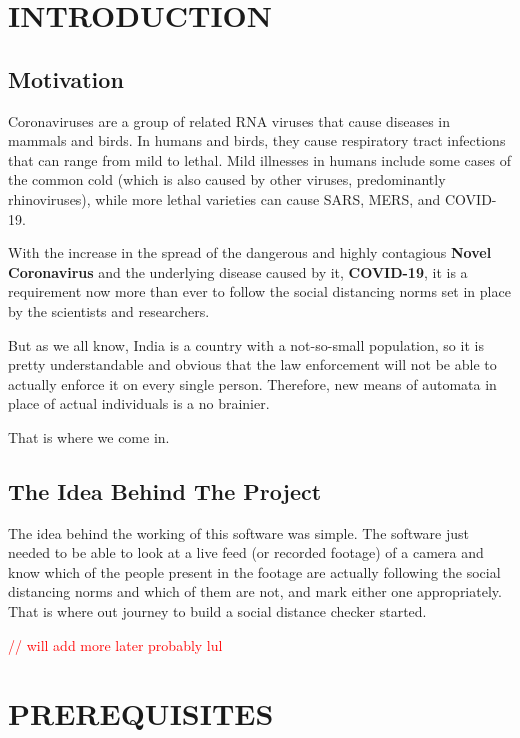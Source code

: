 \documentclass[a4paper]{article}
\begin{document}
\setcounter{page}{1}
\newpage
\setcounter{tocdepth}{2} %
\tableofcontents
{}
\newpage

\setcounter{page}{1}

\section{INTRODUCTION}
\subsection{Motivation}
Coronaviruses are a group of related RNA viruses that cause diseases in mammals
and birds. In humans and birds, they cause respiratory tract infections that can
range from mild to lethal. Mild illnesses in humans include some cases of the
common cold (which is also caused by other viruses, predominantly rhinoviruses),
while more lethal varieties can cause SARS, MERS, and COVID-19.

With the increase in the spread of the dangerous and highly contagious \textbf{Novel Coronavirus}
and the underlying disease caused by it, \textbf{COVID-19},
it is a requirement now more than ever to follow the social distancing
norms set in place by the scientists and researchers.

But as we all know, India is a country with a not-so-small population,
so it is pretty understandable and obvious that the law enforcement will
not be able to actually enforce it on every single person. Therefore,
new means of automata in place of actual individuals is a no brainier.

That is where we come in.

\subsection{The Idea Behind The Project}
The idea behind the working of this software was simple. The software just needed
to be able to look at a live feed (or recorded footage) of a camera and know
which of the people present in the footage are actually following the social
distancing norms and which of them are not, and mark either one appropriately.
That is where out journey to build a social distance checker started.

\textcolor{red}{// will add more later probably lul}

\newpage

\section{PREREQUISITES}
\end{document}
